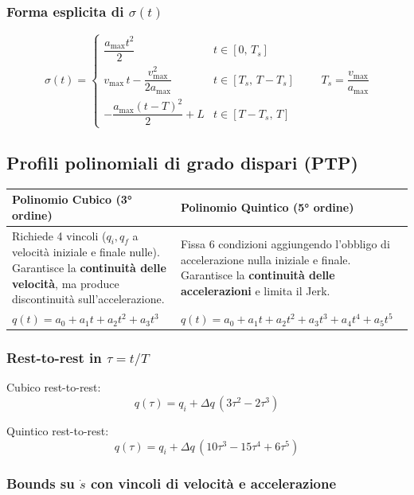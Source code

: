 \documentclass[11pt, a4paper]{article}
\begin{document}
\subsubsection{Forma esplicita di $\sigma(t)$}

\[
\sigma(t) =
\begin{cases}
\dfrac{a_{\max} t^2}{2} & t \in [0,\, T_s] \\[8pt]
v_{\max}\,t - \dfrac{v_{\max}^2}{2a_{\max}} & t \in [T_s,\, T-T_s] \\[8pt]
-\dfrac{a_{\max}(t-T)^2}{2} + L & t \in [T-T_s,\, T]
\end{cases}
\qquad T_s = \frac{v_{\max}}{a_{\max}}
\]

\subsection{Profili polinomiali di grado dispari (PTP)}

\begin{center}
\renewcommand{\arraystretch}{1.6}
\begin{tabular}{p{6cm}p{7.5cm}}
\toprule
\textbf{Polinomio Cubico (3° ordine)} & \textbf{Polinomio Quintico (5° ordine)}\\
\midrule
Richiede 4 vincoli ($q_i, q_f$ a velocità iniziale e finale nulle).
Garantisce la \textbf{continuità delle velocità}, ma produce discontinuità
sull'accelerazione. &
Fissa 6 condizioni aggiungendo l'obbligo di accelerazione nulla iniziale e finale.
Garantisce la \textbf{continuità delle accelerazioni} e limita il Jerk.\\[4pt]
$q(t) = a_0 + a_1 t + a_2 t^2 + a_3 t^3$ &
$q(t) = a_0 + a_1 t + a_2 t^2 + a_3 t^3 + a_4 t^4 + a_5 t^5$\\
\bottomrule
\end{tabular}
\end{center}

\subsubsection{Rest-to-rest in $\tau = t/T$}

Cubico rest-to-rest:
\[
q(\tau) = q_i + \Delta q\,(3\tau^2 - 2\tau^3)
\]

Quintico rest-to-rest:
\[
q(\tau) = q_i + \Delta q\,(10\tau^3 - 15\tau^4 + 6\tau^5)
\]

\subsubsection{Bounds su $\dot{s}$ con vincoli di velocità e accelerazione}
\end{document}
